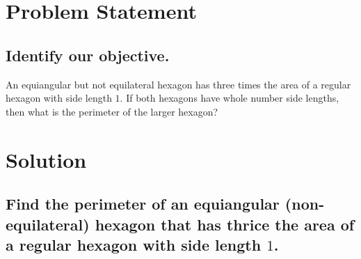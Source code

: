 \documentclass{beamer} %
\begin{document}
\begin{frame} %
  \titlepage
\end{frame}

\section{Problem Statement}

\subsection*{Identify our objective.}

\begin{frame}
An equiangular but not equilateral hexagon has three times the area of a regular hexagon with side length $1$. If both hexagons have whole number side lengths, then what is the perimeter of the larger hexagon?
\end{frame}

\section{Solution}

\subsection*{Find the perimeter of an equiangular (non-equilateral) hexagon that has thrice the area of a regular hexagon with side length $1$.}

\begin{frame}
  \begin{center}
  \end{center}
\end{frame}

\begin{frame}
  \begin{center}
  \end{center}
\end{frame}
\end{document}
